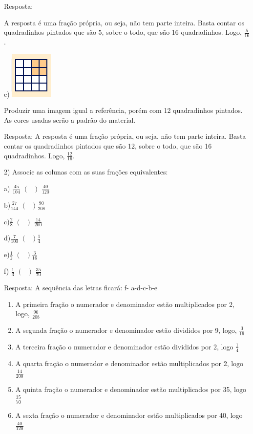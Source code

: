 Resposta:

A resposta é uma fração própria, ou seja, não tem parte inteira. Basta
contar os quadradinhos pintados que são 5, sobre o todo, que são 16
quadradinhos. Logo, \(\frac{5}{16}\).

c)
\includegraphics[width=0.83333in,height=0.91667in]{./imgSAEB_7_MAT/media/image8.png}

Produzir uma imagem igual a referência, porém com 12 quadradinhos
pintados. As cores usadas serão a padrão do material.

Resposta: A resposta é uma fração própria, ou seja, não tem parte
inteira. Basta contar os quadradinhos pintados que são 12, sobre o todo,
que são 16 quadradinhos. Logo, \(\frac{12}{16}\).

2) Associe as colunas com as suas frações equivalentes:

a) \(\frac{45}{104}\) \(\left( \text{\ \ \ \ } \right)\)
\(\frac{40}{120}\)

b)\(\frac{27}{144}\) \(\left( \text{\ \ \ \ \ } \right)\frac{90}{208}\)

c)\(\frac{2}{8}\) \(\left( \text{\ \ \ \ \ \ } \right)\)
\(\frac{14}{200}\)

d)\(\frac{7}{100}\) \(\left( \text{\ \ \ \ \ \ } \right)\frac{1}{4}\)

e)\(\frac{1}{2}\) \(\left( \text{\ \ \ \ \ \ } \right)\frac{3}{16}\)

f) \(\frac{1}{3}\) \(\left( \text{\ \ \ \ \ \ \ } \right)\)
\(\frac{35}{70}\)

Resposta: A sequência das letras ficará: f- a-d-c-b-e

\begin{enumerate}
\def\labelenumi{\alph{enumi})}
\item
  A primeira fração o numerador e denominador estão multiplicados por 2,
  logo, \(\frac{90}{208}\)
\item
  A segunda fração o numerador e denominador estão divididos por 9,
  logo, \(\frac{3}{16}\)
\item
  A terceira fração o numerador e denominador estão divididos por 2,
  logo \(\frac{1}{4}\)
\item
  A quarta fração o numerador e denominador estão multiplicados por 2,
  logo \(\frac{14}{200}\)
\item
  A quinta fração o numerador e denominador estão multiplicados por 35,
  logo\(\frac{35}{70}\)
\item
  A sexta fração o numerador e denominador estão multiplicados por 40,
  logo \(\frac{40}{120}\)
\end{enumerate}

